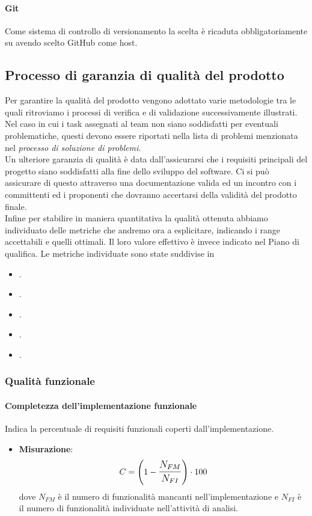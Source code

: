 \paragraph{Git}
Come sistema di controllo di versionamento la scelta è ricaduta obbligatoriamente su  avendo scelto GitHub come host.

\newpage

\subsection{Processo di garanzia di qualità del prodotto}
Per garantire la qualità del prodotto vengono adottato varie metodologie tra le quali ritroviamo i processi di verifica e di validazione successivamente illustrati. \\
Nel caso in cui i task assegnati al team non siano soddisfatti per eventuali problematiche, questi devono essere riportati nella lista di problemi menzionata nel \textit{processo di soluzione di problemi}. \\
Un ulteriore garanzia di qualità è data dall'assicurarsi che i requisiti principali del progetto siano soddisfatti alla fine dello sviluppo del software. Ci si può assicurare di questo attraverso una documentazione valida ed un incontro con i committenti ed i proponenti che dovranno accertarsi della validità del prodotto finale. \\
Infine per stabilire in maniera quantitativa la qualità ottenuta abbiamo individuato delle metriche che andremo ora a esplicitare, indicando i range accettabili e quelli ottimali. Il loro valore effettivo è invece indicato nel Piano di qualifica.
Le metriche individuate sono state suddivise in
\begin{itemize}
	\item\textbf{}.
	\item\textbf{}.
	\item\textbf{}.
	\item\textbf{}.
	\item\textbf{}.
\end{itemize}

\subsubsection{Qualità funzionale}

\paragraph{Completezza dell'implementazione funzionale}
Indica la percentuale di requisiti funzionali coperti dall'implementazione.
\begin{itemize}
	\item \textbf{Misurazione}: 
		$$C=\left(1-\mathlarger{\frac{N_{FM}}{N_{FI}}}\right) \cdot 100$$ 
	dove $N_{FM}$ è il numero di funzionalità mancanti nell'implementazione e $N_{FI}$ è il numero di funzionalità individuate nell'attività di analisi.
\end{itemize}

